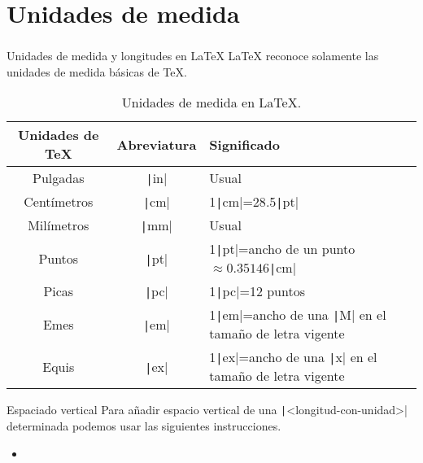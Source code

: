 \section{Unidades de medida}

\begin{frame}
	\frametitle{\secname}

	\begin{block}{Unidades de medida y longitudes en \LaTeX}
		\LaTeX{} reconoce solamente las unidades de medida básicas de \TeX.
		\begin{table}[ht!]
			\centering
			\begin{tabular}{ccl}
				\hline
				Unidades de \TeX & Abreviatura            & Significado                                                                              \\
				\hline
				Pulgadas         & \texttt|in| & Usual                                                                                    \\
				\hline
				Centímetros      & \texttt|cm| & 1\texttt|cm|=28.5\texttt|pt|                                       \\
				\hline
				Milímetros       & \texttt|mm| & Usual                                                                                    \\
				\hline
				Puntos           & \texttt|pt| & 1\texttt|pt|=ancho de un punto$\approx 0.35146$\texttt|cm|         \\
				\hline
				Picas            & \texttt|pc| & 1\texttt|pc|=12 puntos                                                        \\
				\hline
				Emes             & \texttt|em| & 1\texttt|em|=ancho de una \texttt|M| en el tamaño de letra vigente \\
				\hline
				Equis            & \texttt|ex| & 1\texttt|ex|=ancho de una \texttt|x| en el tamaño de letra vigente \\
				\hline
			\end{tabular}
			\caption{Unidades de medida en \LaTeX.}
		\end{table}
	\end{block}

	\pause

	\begin{block}{Espaciado vertical}
		Para añadir espacio vertical de una \texttt|<longitud-con-unidad>|
		determinada podemos usar las siguientes instrucciones.
		\vspace*{-\baselineskip}\setlength\belowdisplayshortskip{0pt}
		\begin{itemize}
			\item


\end{itemize}
\end{block}
\end{frame}

